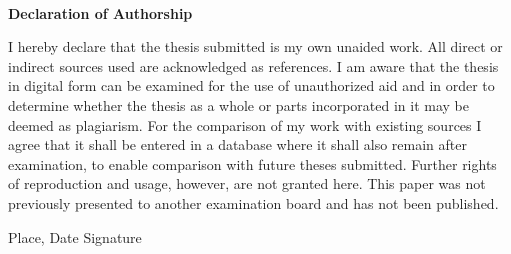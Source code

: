 \ 
\vspace{2cm}

\begin{center}
	\large \textbf{Declaration of Authorship}
\end{center}

\vspace{1cm}
\noindent
I hereby declare that the thesis submitted is my own unaided work. All direct or indirect sources used are acknowledged as references. I am aware that the thesis in digital form can be examined for the use of unauthorized aid and in order to determine whether the thesis as a whole or parts incorporated in it may be deemed as plagiarism. For the comparison of my work with existing sources I agree that it shall be entered in a database where it shall also remain after examination, to enable comparison with future theses submitted. Further rights of reproduction and usage, however, are not granted here. This paper was not previously presented to another examination board and has not been published.

\vspace{2cm}

\hspace{1.5cm} Place, Date \hfill Signature \hspace{1.5cm}